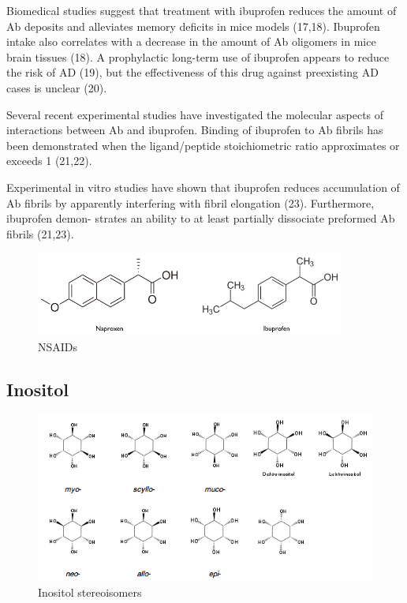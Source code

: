 Biomedical studies suggest that treatment with ibuprofen reduces the amount of Ab deposits and alleviates memory deficits in mice models (17,18). Ibuprofen intake also correlates with a decrease in the amount of Ab oligomers in mice brain tissues (18). A prophylactic long-term use of ibuprofen appears to reduce the risk of AD (19), but the effectiveness of this drug against preexisting AD cases is unclear (20). 

Several recent experimental studies have investigated the molecular aspects of interactions between Ab and ibuprofen. Binding of ibuprofen to Ab fibrils has been demonstrated when the ligand/peptide stoichiometric ratio approximates or exceeds 1 (21,22). 

Experimental in vitro studies have shown that ibuprofen reduces accumulation of Ab fibrils by apparently interfering with fibril elongation (23). Furthermore, ibuprofen demon- strates an ability to at least partially dissociate preformed Ab fibrils (21,23).

\begin{figure}
\centering
\includegraphics[width=4in]{figures/introduction/nsaids.png}
\caption[NSAIDs]{NSAIDs}
\label{fig:nsaids}
\end{figure}

\subsection{Inositol}
\begin{figure}
	\centering
	\includegraphics[width=6in]{figures/introduction/inositol.png}
	\caption[Inositol]{Inositol stereoisomers}
	\label{fig:inositols}
\end{figure}

